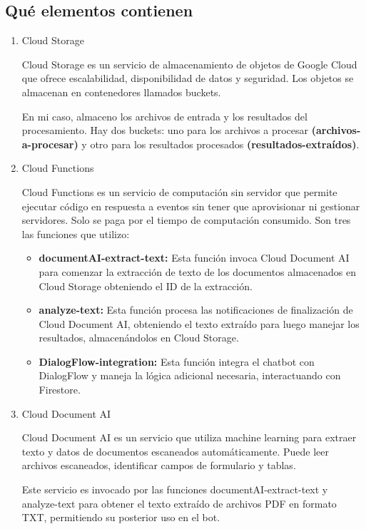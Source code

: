 \subsection{Qué elementos contienen}\label{elementos-gcp}
\begin{enumerate}

    \item Cloud Storage
    
    Cloud Storage es un servicio de almacenamiento de objetos de Google Cloud que ofrece escalabilidad, disponibilidad de datos y seguridad. Los objetos se almacenan en contenedores llamados buckets. 
    
    En mi caso, almaceno los archivos de entrada y los resultados del procesamiento. Hay dos buckets: uno para los archivos a procesar \textbf{(archivos-a-procesar)} y otro para los resultados procesados \textbf{(resultados-extraídos)}.
    
    \item Cloud Functions
    
    Cloud Functions es un servicio de computación sin servidor que permite ejecutar código en respuesta a eventos sin tener que aprovisionar ni gestionar servidores. Solo se paga por el tiempo de computación consumido. Son tres las funciones que utilizo:
    \begin{itemize}
        \item \textbf{documentAI-extract-text:} Esta función invoca Cloud Document AI para comenzar la extracción de texto de los documentos almacenados en Cloud Storage obteniendo el ID de la extracción.
        \item \textbf{analyze-text:} Esta función procesa las notificaciones de finalización de Cloud Document AI, obteniendo el texto extraído para luego manejar los resultados, almacenándolos en Cloud Storage.
        \item \textbf{DialogFlow-integration:} Esta función integra el chatbot con DialogFlow y maneja la lógica adicional necesaria, interactuando con Firestore.
    \end{itemize}
    
    \item Cloud Document AI
    
    Cloud Document AI es un servicio que utiliza machine learning para extraer texto y datos de documentos escaneados automáticamente. Puede leer archivos escaneados, identificar campos de formulario y tablas.
    
    Este servicio es invocado por las funciones documentAI-extract-text y analyze-text para obtener el texto extraído de archivos PDF en formato TXT, permitiendo su posterior uso en el bot.
    

\end{enumerate}
